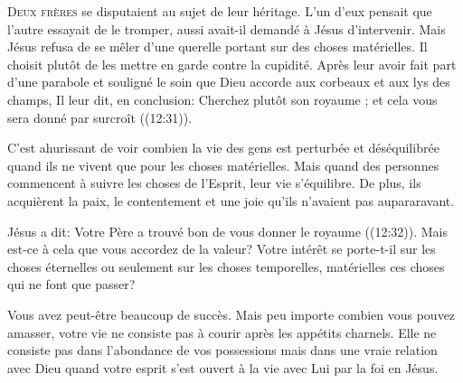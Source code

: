 



\lettrine{D}{eux frères} se disputaient au sujet de leur héritage.
 L'un d'eux pensait que l'autre essayait de le tromper,
 aussi avait-il demandé à Jésus d'intervenir.
 Mais Jésus refusa de se mêler d'une querelle portant
 sur des choses matérielles. Il choisit plutôt de les mettre en garde
 contre la cupidité. Après leur avoir fait part d'une parabole
 et souligné le soin que Dieu accorde aux corbeaux et aux lys des champs,
 Il leur dit, en conclusion: 
 \Og Cherchez plutôt son royaume ; et cela vous sera donné par surcroît \Fg{}
 ((12:31)). 


C'est ahurissant de voir combien la vie des gens est perturbée
 et déséquilibrée quand ils ne vivent que pour les choses matérielles.
 Mais quand des personnes commencent à suivre les choses de l'Esprit,
 leur vie s'équilibre. De plus, ils acquièrent la paix,
 le contentement et une joie qu'ils n'avaient pas aupararavant.

Jésus a dit: 
 \Og Votre Père a trouvé bon de vous donner le royaume \Fg{}
 ((12:32)). Mais est-ce à cela que vous accordez
 de la valeur? Votre intérêt se porte-t-il sur les choses éternelles
 ou seulement sur les choses temporelles, matérielles
 \ocadr ces choses qui ne font que passer?

Vous avez peut-être beaucoup de succès. Mais peu importe combien
 vous pouvez amasser, votre vie ne consiste pas à courir après
 les appétits charnels. Elle ne consiste pas dans l'abondance
 de vos possessions mais dans une vraie relation avec Dieu
 quand votre esprit s'est ouvert à la vie avec Lui par la foi en Jésus.

\dvrule



